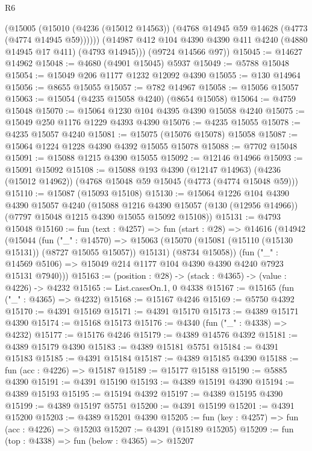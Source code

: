 \begin{lexlean}{R6}
\begin{coremodule}
          (@15005
            (@15010 (@4236 (@15012 @14563)) (@4768 @14945 @59 @14628 (@4773 (@4774 @14945 @59))))))
        (@14987 @412 @104 @4390 @4390 @411 @4240 (@4880 @14945 @17 @411) (@4793 @14945)))
      (@9724 @14566 @97))
@15045 := @14627 @14962
@15048 := @4680 (@4901 @15045) @5937
@15049 := @5788 @15048
@15054 := @15049 @206 @1177 @1232 @12092 @4390
@15055 := @130 @14964
@15056 := @8655 @15055
@15057 := @782 @14967
@15058 := @15056 @15057
@15063 := @15054 (@4235 @15058 @4240) (@8654 @15058)
@15064 := @4759 @15048
@15070 := @15064 @1230 @104 @4395 @4390 @15058 @4240
@15075 := @15049 @250 @1176 @1229 @4393 @4390
@15076 := @4235 @15055
@15078 := @4235 @15057 @4240
@15081 := @15075 (@15076 @15078) @15058
@15087 := @15064 @1224 @1228 @4390 @4392 @15055 @15078
@15088 := @7702 @15048
@15091 := @15088 @1215 @4390 @15055
@15092 := @12146 @14966
@15093 := @15091 @15092
@15108 := @15088
    @193
    @4390
    (@12147 @14963)
    (@4236 (@15012 @14962))
    (@4768 @15048 @59 @15045 (@4773 (@4774 @15048 @59)))
@15110 := @15087 (@15093 @15108)
@15130 := @15064
    @1226
    @104
    @4390
    @4390
    @15057
    @4240
    (@15088
      @1216
      @4390
      @15057
      (@130 (@12956 @14966))
      (@7797 @15048 @1215 @4390 @15055 @15092 @15108))
@15131 := @4793 @15048
@15160 := fun (text : @4257) =>
  fun (start : @28) =>
  @14616
    (@14942
      (@15044
        (fun ("_" : @14570) =>
        @15063
          (@15070 (@15081 (@15110 (@15130 @15131)) (@8727 @15055 @15057)) @15131)
          (@8734 @15058))
        (fun ("_" : @14569 @5106) => @15049 @214 @1177 @104 @4390 @4390 @4240 @7923 @15131 @7940)))
@15163 := (position : @28) -> (stack : @4365) -> (value : @4226) -> @4232
@15165 := List.casesOn.{1, 0} @4338
@15167 := @15165 (fun ("_" : @4365) => @4232)
@15168 := @15167 @4246
@15169 := @5750 @4392
@15170 := @4391 @15169
@15171 := @4391 @15170
@15173 := @4389 @15171 @4390
@15174 := @15168 @15173
@15176 := @4340 (fun ("_" : @4338) => @4232)
@15177 := @15176 @4246
@15179 := @4389 @14576 @4392
@15181 := @4389 @15179 @4390
@15183 := @4389 @15181 @5751
@15184 := @4391 @15183
@15185 := @4391 @15184
@15187 := @4389 @15185 @4390
@15188 := fun (acc : @4226) => @15187
@15189 := @15177 @15188
@15190 := @5885 @4390
@15191 := @4391 @15190
@15193 := @4389 @15191 @4390
@15194 := @4389 @15193
@15195 := @15194 @4392
@15197 := @4389 @15195 @4390
@15199 := @4389 @15197 @5751
@15200 := @4391 @15199
@15201 := @4391 @15200
@15203 := @4389 @15201 @4390
@15205 := fun (key : @4257) => fun (acc : @4226) => @15203
@15207 := @4391 (@15189 @15205)
@15209 := fun (top : @4338) => fun (below : @4365) => @15207

\end{coremodule}
\end{lexlean}
